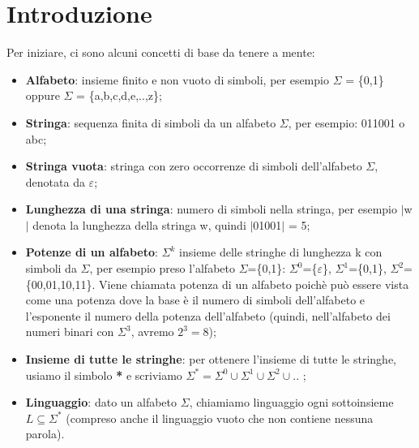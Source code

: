 \chapter{Introduzione}
Per iniziare, ci sono alcuni concetti di base da tenere a mente:

\begin{itemize}

\item \textbf{Alfabeto}: insieme finito e non vuoto di simboli, per esempio
$\Sigma$ = \{0,1\} oppure $\Sigma$ = \{a,b,c,d,e,..,z\};
\item \textbf{Stringa}: sequenza finita di simboli da un alfabeto $\Sigma$, per 
esempio: 011001 o abc;
\item \textbf{Stringa vuota}: stringa con zero occorrenze di simboli dell'alfabeto 
$\Sigma$, denotata da $\varepsilon$;
\item \textbf{Lunghezza di una stringa}: numero di simboli nella stringa, per 
esempio $|$w$|$ denota la lunghezza della stringa w, quindi $|$01001$|$ = 5;
\item \textbf{Potenze di un alfabeto}: $\Sigma^{k}$ insieme delle stringhe di 
lunghezza k con simboli da $\Sigma$, per esempio preso l'alfabeto $\Sigma$=\{0,1\}:
$\Sigma^{0}$=\{$\varepsilon$\}, $\Sigma^{1}$=\{0,1\}, $\Sigma^{2}$=\{00,01,10,11\}.
Viene chiamata potenza di un alfabeto poichè può essere vista come una potenza dove 
la base è il numero di simboli dell'alfabeto e l'esponente il numero della potenza
dell'alfabeto (quindi, nell'alfabeto dei numeri binari con $\Sigma^{3}$, avremo
 $2^{3}=8$);
\item \textbf{Insieme di tutte le stringhe}: per ottenere l'insieme di tutte le 
stringhe, usiamo il simbolo \textbf{*} e scriviamo $\Sigma^{*}=\Sigma^{0} \cup 
\Sigma^{1} \cup \Sigma^{2} \cup ..$ ;
\item \textbf{Linguaggio}: dato un alfabeto $\Sigma$, chiamiamo linguaggio ogni
sottoinsieme $L\subseteq\Sigma^{*}$ (compreso anche il linguaggio vuoto che non 
contiene nessuna parola).

\end{itemize}
